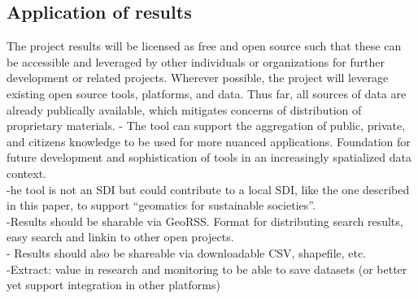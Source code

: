 \subsection{Application of results}
The project results will be licensed as free and open source such that these can be accessible and leveraged by other individuals or organizations for further development or related projects. Wherever possible, the project will leverage existing open source tools, platforms, and data. Thus far, all sources of data are already publically available, which mitigates concerns of distribution of proprietary materials.
-{\color{purple} The tool can support the aggregation of public, private, and citizens knowledge to be used for more nuanced applications.
Foundation for future development and sophistication of tools in an increasingly spatialized data context.} \cite{Afzalan2017}\\
-{\color{purple}he tool is not an SDI but could contribute to a local SDI, like the one described in this paper, to support “geomatics for sustainable societies”.} \cite{Bhattacharya2018}\\
-{\color{purple}Results should be sharable via GeoRSS. Format for distributing search results, easy search and linkin to other open projects.}\cite{Xing2015}\\
-{\color{purple} Results should also be shareable via downloadable CSV, shapefile, etc.}\\
-{\color{purple}Extract: value in research and monitoring to be able to save datasets (or better yet support integration in other platforms)\cite{Shneiderman1996}}\\

